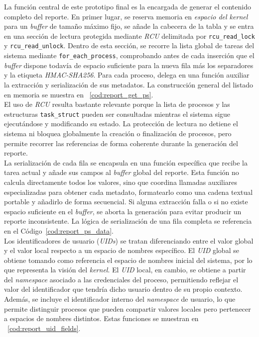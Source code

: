 La función central de este prototipo final es la encargada de generar el contenido completo del reporte.
En primer lugar, se reserva memoria en \textit{espacio del kernel} para un \textit{buffer} de tamaño máximo fijo, se añade la cabecera de la tabla y se entra en una sección de lectura protegida mediante \textit{RCU} delimitada por \verb|rcu_read_lock| y \verb|rcu_read_unlock|.
Dentro de esta sección, se recorre la lista global de tareas del sistema mediante \texttt{for\_each\_process}, comprobando antes de cada inserción que el \textit{buffer} dispone todavía de espacio suficiente para la nueva fila más los separadores y la etiqueta \textit{HMAC-SHA256}.
Para cada proceso, delega en una función auxiliar la extracción y serialización de sus metadatos.
La construcción general del listado en memoria se muestra en ~\ref{cod:report_get_ps}.\\

El uso de \textit{RCU} resulta bastante relevante porque la lista de procesos y las estructuras \texttt{task\_struct} pueden ser consultadas mientras el sistema sigue ejecutándose y modificando su estado.
La protección de lectura no detiene el sistema ni bloquea globalmente la creación o finalización de procesos, pero permite recorrer las referencias de forma coherente durante la generación del reporte.\\

La serialización de cada fila se encapsula en una función específica que recibe la tarea actual y añade sus campos al \textit{buffer} global del reporte.
Esta función no calcula directamente todos los valores, sino que coordina llamadas auxiliares especializadas para obtener cada metadato, formatearlo como una cadena textual portable y añadirlo de forma secuencial.
Si alguna extracción falla o si no existe espacio suficiente en el \textit{buffer}, se aborta la generación para evitar producir un reporte inconsistente.
La lógica de serialización de una fila completa se referencia en el Código~\ref{cod:report_ps_data}.\\

Los identificadores de usuario (\textit{UIDs}) se tratan diferenciando entre el valor global y el valor local respecto a un espacio de nombres específico.
El \textit{UID} global se obtiene tomando como referencia el espacio de nombres inicial del sistema, por lo que representa la visión del \textit{kernel}.
El \textit{UID} local, en cambio, se obtiene a partir del \textit{namespace} asociado a las credenciales del proceso, permitiendo reflejar el valor del identificador que tendría dicho usuario dentro de su propio contexto.
Además, se incluye el identificador interno del \textit{namespace} de usuario, lo que permite distinguir procesos que pueden compartir valores locales pero pertenecer a espacios de nombres distintos.
Estas funciones se muestran en ~\ref{cod:report_uid_fields}.\\

